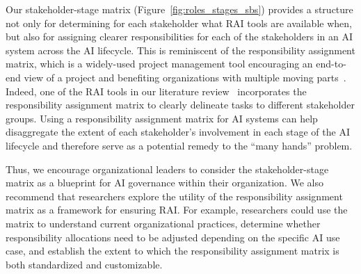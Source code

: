 Our stakeholder-stage matrix (Figure~\ref{fig:roles_stages_sbs}) provides a structure not only for determining for each stakeholder what RAI tools are available when, but also for assigning clearer responsibilities for each of the stakeholders in an AI system across the AI lifecycle.
This is reminiscent of the responsibility assignment matrix, which is a widely-used project management tool encouraging an end-to-end view of a project and benefiting organizations with multiple moving parts~\cite{wittenberg2024everything}.
Indeed, one of the RAI tools in our literature review~\cite{Johnson2023} incorporates the responsibility assignment matrix to clearly delineate tasks to different stakeholder groups. 
Using a responsibility assignment matrix for AI systems can help disaggregate the extent of each stakeholder's involvement in each stage of the AI lifecycle and therefore serve as a potential remedy to the ``many hands'' problem.

Thus, we encourage organizational leaders to consider the stakeholder-stage matrix as a blueprint for AI governance within their organization.
We also recommend that researchers explore the utility of the responsibility assignment matrix as a framework for ensuring RAI. 
For example, researchers could use the matrix to understand current organizational practices, determine whether responsibility allocations need to be adjusted depending on the specific AI use case, and establish the extent to which the responsibility assignment matrix is both standardized and customizable.



